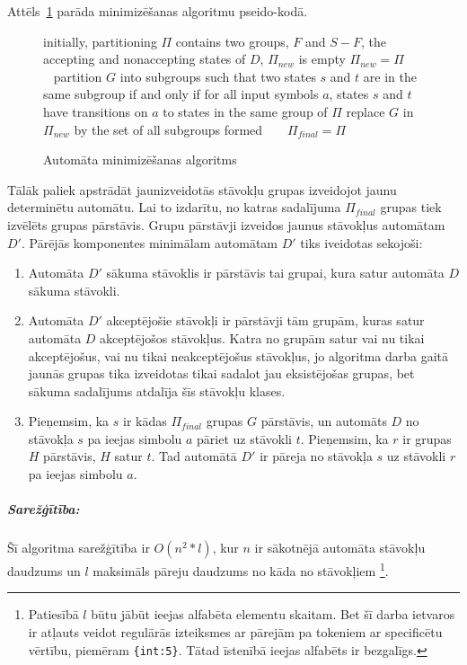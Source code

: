 Attēls~\ref{fig:min_algorithm} parāda minimizēšanas algoritmu pseido-kodā.

\begin{figure}[h]
  \begin{algorithmic}
  \State initially, partitioning $\Pi$ contains two groups, $F$ and $S-F$, the accepting and nonaccepting states of $D$, $\Pi_{new}$ is empty
      \State $\Pi_{new} = \Pi$
          \State partition $G$ into subgroups such that two states $s$ and $t$ are in the same subgroup if and only if for all input symbols $a$, states $s$ and $t$ have transitions on $a$ to states in the same group of $\Pi$
          \State replace $G$ in $\Pi_{new}$ by the set of all subgroups formed
      \EndFor
  \EndWhile
  \State $\Pi_{final} = \Pi$
  \end{algorithmic}
  \caption{\label{fig:min_algorithm}Automāta minimizēšanas algoritms}
\end{figure}

Tālāk paliek apstrādāt jaunizveidotās stāvokļu grupas izveidojot jaunu determinētu automātu. Lai to izdarītu, no katras sadalījuma $\Pi_{final}$ grupas tiek izvēlēts grupas pārstāvis. Grupu pārstāvji izveidos jaunus stāvokļus automātam $D'$. Pārējās komponentes minimālam automātam $D'$ tiks iveidotas sekojoši:
\begin{enumerate}
\item Automāta $D'$ sākuma stāvoklis ir pārstāvis tai grupai, kura satur automāta $D$ sākuma stāvokli.
\item Automāta $D'$ akceptējošie stāvokļi ir pārstāvji tām grupām, kuras satur automāta $D$ akceptējošos stāvokļus. Katra no grupām satur vai nu tikai akceptējošus, vai nu tikai neakceptējošus stāvokļus, jo algoritma darba gaitā jaunās grupas tika izveidotas tikai sadalot jau eksistējošas grupas, bet sākuma sadalījums atdalīja šīs stāvokļu klases.
\item Pieņemsim, ka $s$ ir kādas $\Pi_{final}$ grupas $G$ pārstāvis, un automāts $D$ no stāvokļa $s$ pa ieejas simbolu $a$ pāriet uz stāvokli $t$. Pieņemsim, ka $r$ ir grupas $H$ pārstāvis, $H$ satur $t$. Tad automātā $D'$ ir pāreja no stāvokļa $s$ uz stāvokli $r$ pa ieejas simbolu $a$.
\end{enumerate}

\subparagraph{Sarežģītība:}
Šī algoritma sarežģītība ir $O(n^2*l)$, kur $n$ ir sākotnējā automāta stāvokļu daudzums un $l$ maksimāls pāreju daudzums no kāda no stāvokļiem \footnote{Patiesībā $l$ būtu jābūt ieejas alfabēta elementu skaitam. Bet šī darba ietvaros ir atļauts veidot regulārās izteiksmes ar pārejām pa tokeniem ar specificētu vērtību, piemēram \texttt{\{int:5\}}. Tātad īstenībā ieejas alfabēts ir bezgalīgs.}.

